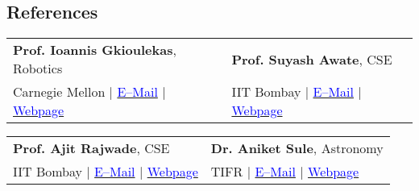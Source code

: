 \documentclass[margin,line]{res}
\begin{document}
\begin{resume}
\section{\sc References}
\vspace{0.05in}
\begin{tabular}{@{}p{3in}p{3in}}
\textbf{Prof. Ioannis Gkioulekas}, Robotics & \textbf{Prof. Suyash Awate}, CSE \\ 
Carnegie Mellon $|$ \href{mailto:igkioule@cs.cmu.edu}{\textcolor{blue}{E--Mail}} $|$ \href{http://www.cs.cmu.edu/~igkioule/}{\textcolor{blue}{Webpage}} & IIT Bombay $|$ \href{mailto:suyash@cse.iitb.ac.in}{\textcolor{blue}{E--Mail}} $|$ \href{https://www.cse.iitb.ac.in/~suyash}{\textcolor{blue}{Webpage}} \\
\end{tabular}
\vspace{-0.15in}

\begin{tabular}{@{}p{3in}p{3in}}
\textbf{Prof. Ajit Rajwade}, CSE & \textbf{Dr. Aniket Sule}, Astronomy \\
IIT Bombay $|$ \href{mailto:ajitvr@cse.iitb.ac.in}{\textcolor{blue}{E--Mail}} $|$ \href{https://www.cse.iitb.ac.in/~ajitvr}{\textcolor{blue}{Webpage}} & TIFR $|$ \href{mailto:anikets@hbcse.tifr.res.in}{\textcolor{blue}{E--Mail}} $|$ \href{http://www.hbcse.tifr.res.in/people/academic/aniket-sule}{\textcolor{blue}{Webpage}} \\
\end{tabular}
\vspace{-0.15in}



\end{resume}
\end{document}

